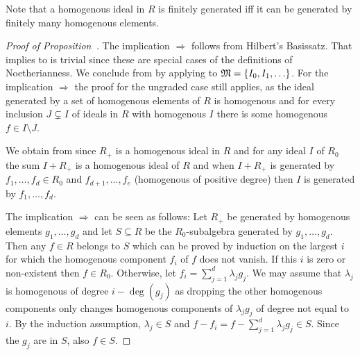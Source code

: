 \documentclass[a4paper,parskip=half,numbers=enddot, DIV=12]{scrreprt}
\begin{document}
\begin{rem}
    Note that a homogenous ideal in $R$ is finitely generated iff it can be generated by finitely many homogenous elements.
\end{rem}
\begin{proof}[Proof of Proposition~]
    The implication  $\Rightarrow$  follows from Hilbert's Basissatz. That  implies  to  is trivial since these are special cases of the definitions of Noetherianness. We conclude  from  by applying  to $\mathfrak{M}=\{I_0,I_1,\ldots\}$. For the implication  $\Rightarrow$  the proof for the ungraded case still applies, as the ideal generated by a set of homogenous elements of $R$ is homogenous and for every inclusion $J\subsetneq I$ of ideals in $R$ with homogenous $I$ there is some homogenous $f\in I\setminus J$.
    
    We obtain  from  since $R_+$ is a homogenous ideal in $R$ and for any ideal $I$ of $R_0$ the sum $I+R_+$ is a homogenous ideal of $R$ and when $I+R_+$ is generated by $f_1,\ldots, f_d\in R_0$ and $f_{d+1},\ldots,f_e$ (homogenous of positive degree) then $I$ is generated by $f_1,\ldots, f_d$.
    
    The implication  $\Rightarrow$  can be seen as follows: Let $R_+$ be generated by homogenous elements $g_1,\ldots, g_d$ and let $S\subseteq R$ be the $R_0$-subalgebra generated by $g_1,\ldots, g_d$. Then any $f\in R$ belongs to $S$ which can be proved by induction on the largest $i$ for which the homogenous component $f_i$ of $f$ does not vanish. If this $i$ is zero or non-existent then $f\in R_0$. Otherwise, let $f_i = \sum_{j=1}^d \lambda_jg_j$. We may assume that $\lambda_j$ is homogenous of degree $i-\deg(g_j)$ as dropping the other homogenous components only changes homogenous components of $\lambda_j g_j$ of degree not equal to $i$. By the induction assumption, $\lambda_j\in S$ and $f-f_i = f-\sum_{j=1}^d\lambda_j g_j\in S$. Since the $g_j$ are in $S$, also $f\in S$.
\end{proof}
\end{document}
